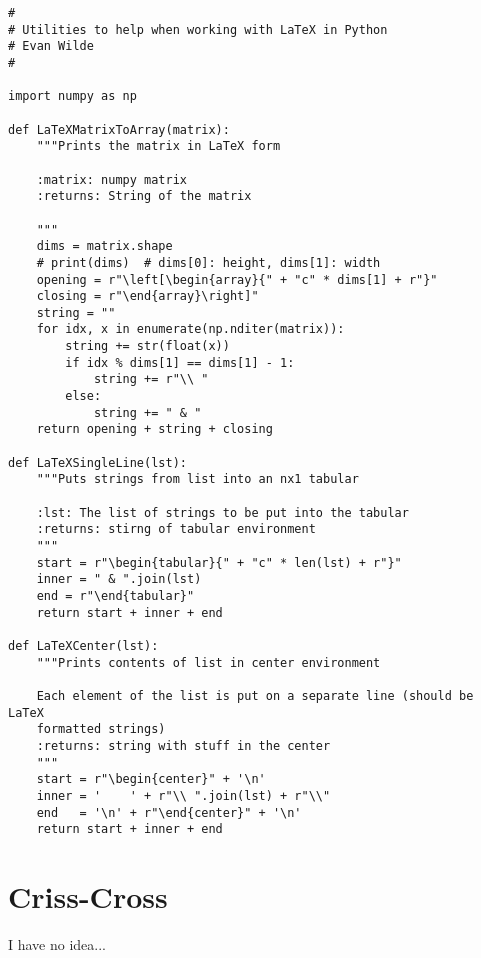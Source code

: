 \documentclass{article}
\begin{document}
\begin{lstlisting}
#
# Utilities to help when working with LaTeX in Python
# Evan Wilde
#

import numpy as np

def LaTeXMatrixToArray(matrix):
    """Prints the matrix in LaTeX form

    :matrix: numpy matrix
    :returns: String of the matrix

    """
    dims = matrix.shape
    # print(dims)  # dims[0]: height, dims[1]: width
    opening = r"\left[\begin{array}{" + "c" * dims[1] + r"}"
    closing = r"\end{array}\right]"
    string = ""
    for idx, x in enumerate(np.nditer(matrix)):
        string += str(float(x))
        if idx % dims[1] == dims[1] - 1:
            string += r"\\ "
        else:
            string += " & "
    return opening + string + closing

def LaTeXSingleLine(lst):
    """Puts strings from list into an nx1 tabular

    :lst: The list of strings to be put into the tabular
    :returns: stirng of tabular environment
    """
    start = r"\begin{tabular}{" + "c" * len(lst) + r"}"
    inner = " & ".join(lst)
    end = r"\end{tabular}"
    return start + inner + end

def LaTeXCenter(lst):
    """Prints contents of list in center environment

    Each element of the list is put on a separate line (should be LaTeX
    formatted strings)
    :returns: string with stuff in the center
    """
    start = r"\begin{center}" + '\n'
    inner = '    ' + r"\\ ".join(lst) + r"\\"
    end   = '\n' + r"\end{center}" + '\n'
    return start + inner + end
\end{lstlisting}

\section{Criss-Cross}

I have no idea...
\end{document}
